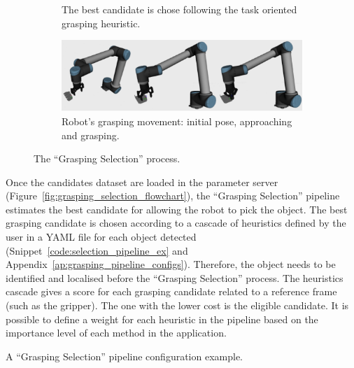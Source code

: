 \begin{figure}[h!]
{\begin{tcolorbox}
\begin{subfigure}[c]{.3\textwidth}
				\caption{The best candidate is chose following the task oriented grasping heuristic.}
				\label{fig:grasp_estimation_02}
			\end{subfigure}
			\quad
			\begin{subfigure}[c]{1\textwidth}
				\centering
				\includegraphics[trim={0cm 0cm 0cm 0cm},clip,width=1\linewidth,angle=0]{Cap4/Figuras/grasping_gray_bg_03.pdf}
				\caption{Robot's grasping movement: initial pose, approaching and grasping.}
				\label{fig:grasp_estimation_03}
			\end{subfigure}
			\end{tcolorbox}
			\caption{The ``Grasping Selection'' process.}
			\label{fig:grasp_estimation}
	}%
\end{figure}


Once the candidates dataset are loaded in the parameter server (Figure~\ref{fig:grasping_selection_flowchart}), the ``Grasping Selection'' pipeline estimates the best candidate for allowing the robot to pick the object. The best grasping candidate is chosen according to a cascade of heuristics defined by the user in a YAML file for each object detected (Snippet~\ref{code:selection_pipeline_ex} and Appendix~\ref{ap:grasping_pipeline_configs}). Therefore, the object needs to be identified and localised before the ``Grasping Selection'' process. The heuristics cascade gives a score for each grasping candidate related to a reference frame (such as the gripper). The one with the lower cost is the eligible candidate. It is possible to define a weight for each heuristic in the pipeline based on the importance level of each method in the application.

\begin{snippet}[h!]
\centering
{}
\caption{A ``Grasping Selection'' pipeline configuration example.}
\label{code:selection_pipeline_ex}
\end{snippet}

